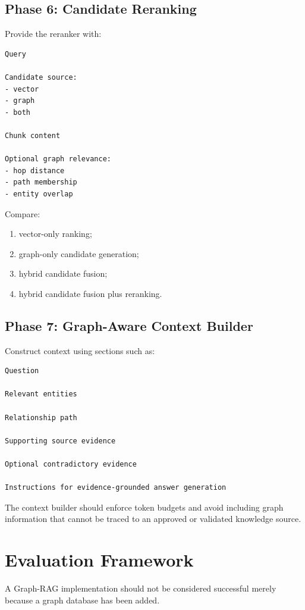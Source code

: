 \documentclass[11pt,a4paper]{article}
\begin{document}
\subsection{Phase 6: Candidate Reranking}

Provide the reranker with:

\begin{lstlisting}
Query

Candidate source:
- vector
- graph
- both

Chunk content

Optional graph relevance:
- hop distance
- path membership
- entity overlap
\end{lstlisting}

Compare:

\begin{enumerate}
\item vector-only ranking;
\item graph-only candidate generation;
\item hybrid candidate fusion;
\item hybrid candidate fusion plus reranking.
\end{enumerate}

\subsection{Phase 7: Graph-Aware Context Builder}

Construct context using sections such as:

\begin{lstlisting}
Question

Relevant entities

Relationship path

Supporting source evidence

Optional contradictory evidence

Instructions for evidence-grounded answer generation
\end{lstlisting}

The context builder should enforce token budgets and avoid including graph information that cannot be traced to an approved or validated knowledge source.

\section{Evaluation Framework}

A Graph-RAG implementation should not be considered successful merely because a graph database has been added.
\end{document}
